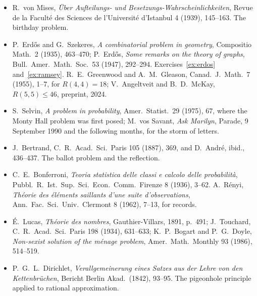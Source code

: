 \begin{itemize}
\item R.~von Mises, \emph{\"Uber Aufteilungs- und Besetzungs-Wahrscheinlichkeiten}, Revue de la Facult\'e des Sciences de l'Universit\'e d'Istanbul 4 (1939), 145--163. The birthday problem.
\item P.~Erd\H{o}s and G.~Szekeres, \emph{A combinatorial problem in geometry}, Compositio Math.\ 2 (1935), 463--470; P.~Erd\H os, \emph{Some remarks on the theory of graphs}, Bull.\ Amer.\ Math.\ Soc.\ 53 (1947), 292--294. Exercises~\ref{ex:erdos} and~\ref{ex:ramsey}. R.~E.~Greenwood and A.~M.~Gleason, Canad.\ J.\ Math.\ 7 (1955), 1--7, for $R(4,4)=18$; V.~Angeltveit and B.~D.~McKay, \emph{$R(5,5)\le46$}, preprint, 2024.
\item S.~Selvin, \emph{A problem in probability}, Amer.\ Statist.\ 29 (1975), 67, where the Monty Hall problem was first posed; M.~vos Savant, \emph{Ask Marilyn}, Parade, 9 September 1990 and the following months, for the storm of letters.
\item J.~Bertrand, C.\ R.\ Acad.\ Sci.\ Paris 105 (1887), 369, and D.~Andr\'e, ibid., 436--437. The ballot problem and the reflection.
\item C.~E.~Bonferroni, \emph{Teoria statistica delle classi e calcolo delle probabilit\`a}, Pubbl.\ R.\ Ist.\ Sup.\ Sci.\ Econ.\ Comm.\ Firenze 8 (1936), 3--62. A.~R\'enyi, \emph{Th\'eorie des \'el\'ements saillants d'une suite d'observations}, Ann.\ Fac.\ Sci.\ Univ.\ Clermont 8 (1962), 7--13, for records.
\item \'E.~Lucas, \emph{Th\'eorie des nombres}, Gauthier-Villars, 1891, p.~491; J.~Touchard, C.\ R.\ Acad.\ Sci.\ Paris 198 (1934), 631--633; K.~P.~Bogart and P.~G.~Doyle, \emph{Non-sexist solution of the m\'enage problem}, Amer.\ Math.\ Monthly 93 (1986), 514--519.
\item P.~G.~L.~Dirichlet, \emph{Verallgemeinerung eines Satzes aus der Lehre von den Kettenbr\"uchen}, Bericht Berlin Akad.\ (1842), 93--95. The pigeonhole principle applied to rational approximation.
\end{itemize}
